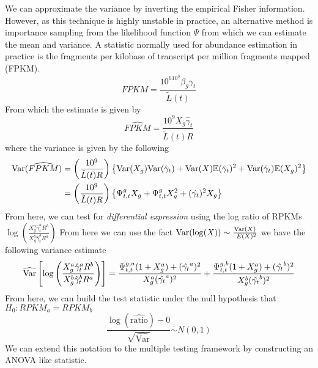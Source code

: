 \documentclass[11pt]{article}
\begin{document}
We can approximate the variance by inverting the empirical Fisher information. However, as this technique is highly unstable in practice, an alternative method is importance sampling from the likelihood function $\Psi$ from which we can estimate the mean and variance. A statistic normally used for abundance estimation in practice is the fragments per kilobase of transcript per million fragments mapped (FPKM).
\begin{equation}
FPKM = \frac{10^610^3\beta_g\gamma_t}{\tilde{L}(t)}
\end{equation}
From which the estimate is given by 
\begin{equation}
\widehat{FPKM} = \frac{10^9X_g\hat{\gamma}_t}{\tilde{L}(t)R}
\end{equation}
where the variance is given by the following
\begin{align*}
{\text{Var}}(\widehat{FPKM})&= \left(\frac{10^9}{\tilde{L}(t)R}\right)\left\{{\text{Var}}(X_g){\text{Var}}(\hat{\gamma}_t) + {\text{Var}}(X){\mathbb{E}}(\hat{\gamma}_t)^2 + {\text{Var}}(\hat{\gamma}_t){\mathbb{E}}(X_g)^2\right\}\\ 
&= \left(\frac{10^9}{\tilde{L}(t)R}\right)\left\{\Psi_{t,t}^gX_g + \Psi_{t,t}^gX_g^2 + (\hat{\gamma_t})^2X_g\right\}
\end{align*}
From here, we can test for \textit{differential expression} using the log ratio of RPKMs $\displaystyle\log\left(\frac{X_g^a\hat{\gamma}_t^aR^b}{X_g^b\hat{\gamma}_t^bR^a}\right)$
From here we can use the fact ${\text{Var}}(\log(X))\sim \frac{{\text{Var}}(X)}{\
E(X)^2}$ we have the following variance estimate 
\begin{equation}
\widehat{{\text{Var}}}\left[\log\left(\frac{X_g^a\hat{\gamma}_t^aR^b}{X_g^b\hat{\gamma}_t^bR^a}\right)\right] = \frac{\Psi_{t,t}^{g,a}(1+X_g^a)+(\hat{\gamma_t}^a)^2}{X_g^a (\hat{\gamma_t}^a)^2} + \frac{\Psi_{t,t}^{g,b}(1+X_g^a)+(\hat{\gamma_t}^b)^2}{X_g^b (\hat{\gamma_t}^b)^2}
\end{equation}
From here, we can build the test statistic under the null hypothesis that $H_0: RPKM_a = RPKM_b$
\begin{equation}
\frac{\log(\widehat{\text{ratio}}) - 0 }{\sqrt{\widehat{\text{Var}}}}\overset{\cdot}{\sim}N(0,1)
\end{equation}
We can extend this notation to the multiple testing framework by constructing an ANOVA like statistic. 
\end{document}
